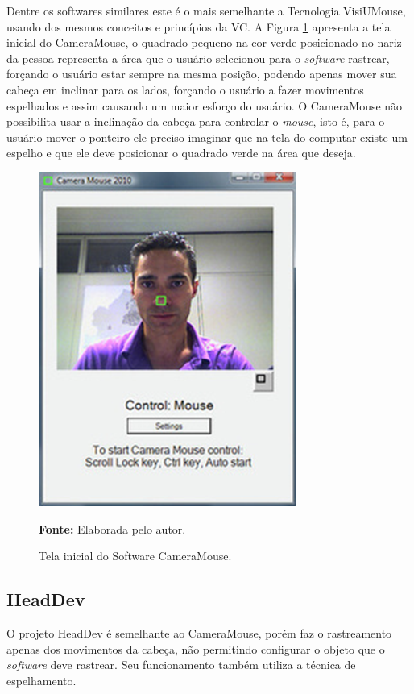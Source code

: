 Dentre os softwares similares este é o mais semelhante a Tecnologia VisiUMouse, usando dos mesmos conceitos e princípios da VC. A Figura \ref{fig:camera-mouse} apresenta a tela inicial do CameraMouse, o quadrado pequeno na cor verde posicionado no nariz da pessoa representa a área que o usuário selecionou para o \textit{software} rastrear, forçando o usuário estar sempre na mesma posição, podendo apenas mover sua cabeça em inclinar para os lados, forçando o usuário a fazer movimentos espelhados  e assim causando um maior esforço do usuário. O CameraMouse não possibilita usar a inclinação da cabeça para controlar o \textit{mouse}, isto é, para o usuário mover o ponteiro ele preciso imaginar que na tela do computar existe um espelho e que ele deve posicionar o quadrado verde na área que deseja.

\begin{figure}[ht]
 \caption{Tela inicial do Software CameraMouse.} 
\centering \includegraphics[scale=1]{img/camera-mouse.png}

{\fontsize{11}{11}\selectfont \textbf{Fonte:} Elaborada pelo autor.}
\label{fig:camera-mouse}
\end{figure}

\subsection{HeadDev}

O projeto HeadDev  é semelhante ao CameraMouse, porém faz o rastreamento apenas dos movimentos da cabeça, não permitindo configurar o objeto que o \textit{software} deve rastrear. Seu funcionamento também utiliza a técnica de espelhamento.

